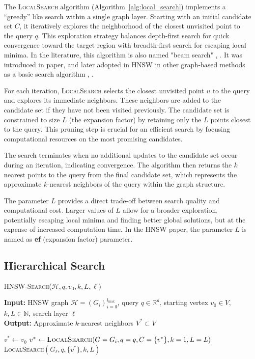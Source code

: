 \documentclass{article}
\begin{document}
The \textsc{LocalSearch} algorithm (Algorithm~\ref{alg:local_search}) implements a ``greedy'' like search within a single graph layer. Starting with an initial candidate set $C$, it iteratively explores the neighborhood of the closest unvisited point to the query $q$. This exploration strategy balances depth-first search for quick convergence toward the target region with breadth-first search for escaping local minima. In the literature, this algorithm is also named "beam search" \cite{prokhorenkova2020graph}, \cite{yang2024revisiting}. It was introduced in \cite{nsw2011} paper, and later adopted in HNSW in other graph-based methods as a basic search algorithm \cite{diskann}, \cite{wang2021comprehensive}.

For each iteration, \textsc{LocalSearch} selects the closest unvisited point $u$ to the query and explores its immediate neighbors. These neighbors are added to the candidate set if they have not been visited previously. The candidate set is constrained to size $L$ (the expansion factor) by retaining only the $L$ points closest to the query. This pruning step is crucial for an efficient search by focusing computational resources on the most promising candidates.

The search terminates when no additional updates to the candidate set occur during an iteration, indicating convergence. The algorithm then returns the $k$ nearest points to the query from the final candidate set, which represents the approximate $k$-nearest neighbors of the query within the graph structure.

The parameter $L$ provides a direct trade-off between search quality and computational cost. Larger values of $L$ allow for a broader exploration, potentially escaping local minima and finding better global solutions, but at the expense of increased computation time. In the HNSW paper, the parameter $L$ is named as \textbf{ef} (expansion factor) parameter.

\subsection{Hierarchical Search}
\label{subasec: hnsw-search}

\begin{algorithm}
\caption{\textsc{HNSW-Search}($\mathcal{H}, q, v_0, k, L, \ell$)}\label{alg:hnsw_search}
\textbf{Input:} HNSW graph $\mathcal{H} = (G_i)_{i=0}^{l_{\max}}$, query $q \in \mathbb{R}^d$, starting vertex $v_0 \in V$, $k, L \in \mathbb{N}$, search layer $\ell$ \\
\textbf{Output:} Approximate $k$-nearest neighbors $V^* \subset V$
\begin{algorithmic}[1]
\State $v^* \gets v_0$ 
    \State $v^* \gets \textsc{LocalSearch}(G=G_i, q=q, C=\{v^*\}, k=1, L=L)$
\EndFor
\State \Return \textsc{LocalSearch}$(G_\ell, q, \{v^*\}, k, L)$
\end{algorithmic}
\end{algorithm}
\end{document}
